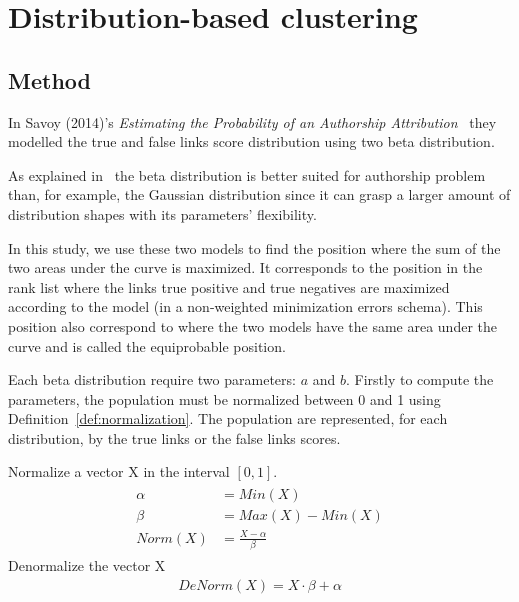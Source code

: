 \section{Distribution-based clustering\label{sec:distribution_based_clustering}}

\subsection{Method}

In Savoy (2014)'s \textit{Estimating the Probability of an Authorship Attribution}~\cite{savoy_probability} they modelled the true and false links score distribution using two beta distribution.

As explained in~\cite{savoy_probability} the beta distribution is better suited for authorship problem than, for example, the Gaussian distribution since it can grasp a larger amount of distribution shapes with its parameters' flexibility.

In this study, we use these two models to find the position where the sum of the two areas under the curve is maximized.
It corresponds to the position in the rank list where the links true positive and true negatives are maximized according to the model (in a non-weighted minimization errors schema).
This position also correspond to where the two models have the same area under the curve and is called the equiprobable position.

Each beta distribution require two parameters: $a$ and $b$.
Firstly to compute the parameters, the population must be normalized between 0 and 1 using Definition~\ref{def:normalization}.
The population are represented, for each distribution, by the true links or the false links scores.

\begin{definition}
  Normalize a vector X in the interval $[0, 1]$.
  \begin{gather*}
    \begin{aligned}
      \alpha &= Min(X) \\
      \beta &= Max(X) - Min(X) \\
      Norm(X) &= \frac{X - \alpha}{\beta}
    \end{aligned}
  \end{gather*}
  Denormalize the vector X
  \begin{gather*}
    DeNorm(X) = X \cdot \beta + \alpha
  \end{gather*}
\end{definition}

